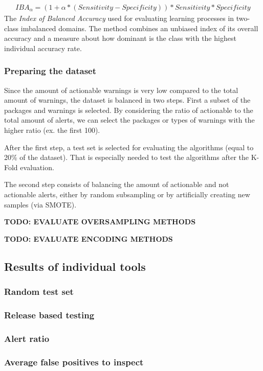 \documentclass{article}
\begin{document}
\begin{gather*}
IBA_{\alpha} = (1 + \alpha * (Sensitivity - Specificity)) * Sensitivity * Specificity
\end{gather*} 
The \textit{Index of Balanced Accuracy} used for evaluating learning processes in two-class imbalanced domains. The
method combines an unbiased index of its overall accuracy and a measure about
how dominant is the class with the highest individual accuracy rate.


\subsubsection{Preparing the dataset}
Since the amount of actionable warnings is very low compared to the total amount of warnings, the dataset is balanced in two steps. First a subset of the packages and warnings is selected. By considering the ratio of actionable to the total amount of alerts, we can select the packages or types of warnings with the higher ratio (ex. the first 100).

After the first step, a test set is selected for evaluating the algorithms (equal to 20\% of the dataset).
That is especially needed to test the algorithms after the K-Fold evaluation.

The second step consists of balancing the amount of actionable and not actionable alerts, either by random subsampling or by artificially creating new samples (via SMOTE).


\textbf{TODO: EVALUATE OVERSAMPLING METHODS}

\textbf{TODO: EVALUATE ENCODING METHODS}

\subsection{Results of individual tools}

\subsubsection{Random test set}
\subsubsection{Release based testing}
\subsubsection{Alert ratio}
\subsubsection{Average false positives to inspect}
\end{document}
